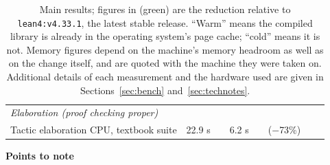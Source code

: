 \documentclass{article}
\newcommand{\currentlean}{\texttt{lean4:v4.33.1}\xspace}
\newcommand{\imp}[1]{{\color{impcolor}\textrm{(#1)}}}
\begin{document}
\begin{table}[htbp]
\begin{tabular}{lrrrrrrl}
\\
\midrule
\multicolumn{8}{l}{\textit{Elaboration (proof checking proper)}} \\
\quad Tactic elaboration CPU, textbook suite & 22.9 s & & 6.2 s & & \imp{$-$73\%} & 
\\
\bottomrule
\end{tabular}
\caption{Main results; figures in \imp{green} are the reduction relative to \currentlean, the latest stable release. ``Warm'' means the compiled library is already in the operating system's page cache; ``cold'' means it is not. Memory figures depend on the machine's memory headroom as well as on the change itself, and are quoted with the machine they were taken on. Additional details of each measurement and the hardware used are given in Sections~\ref{sec:bench} and~\ref{sec:technotes}.}
\label{tab:summary}
\end{table}

\noindent\textbf{Points to note}
\end{document}
